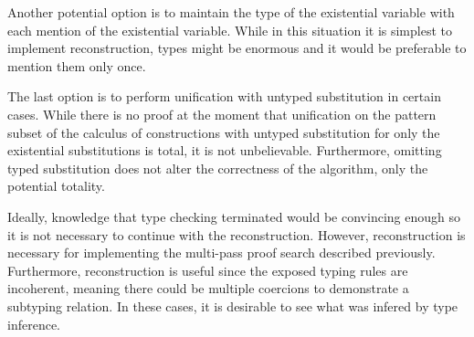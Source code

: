 Another potential option is to maintain the type of the existential variable 
with each mention of the existential variable.  
While in this situation it is simplest to implement reconstruction, 
types might be enormous and it would be preferable to mention them only once.  

The last option is to perform unification with untyped substitution in certain cases.  
While there is no proof at the moment that unification on the pattern subset of 
the calculus of constructions with untyped substitution for only the existential substitutions
is total, it is not unbelievable.  Furthermore, omitting typed substitution does not alter
the correctness of the algorithm, only the potential totality.  

Ideally, knowledge that type checking terminated would be convincing enough
so it is not necessary to continue with the reconstruction.  However, reconstruction
is necessary for implementing the multi-pass proof search described previously.  
Furthermore, reconstruction is useful since the exposed typing rules are incoherent, 
meaning there could be multiple coercions to demonstrate a subtyping relation.  In these cases, it is desirable to see what was infered by type inference.

